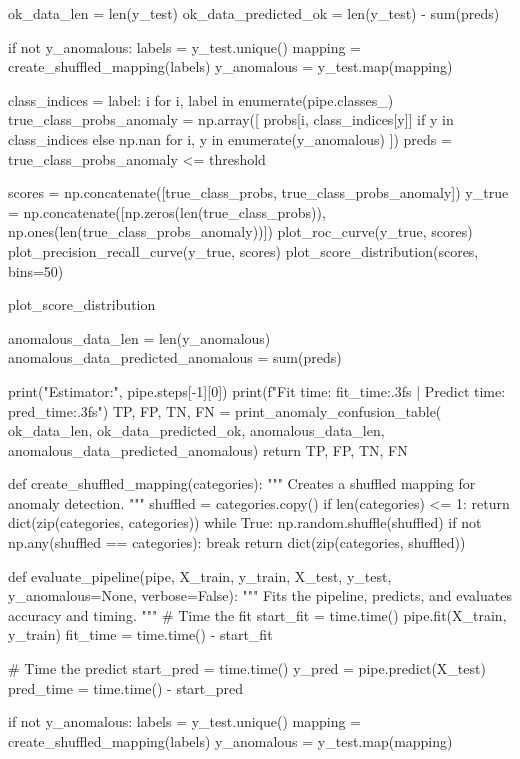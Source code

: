 {{    ok_data_len = len(y_test)
    ok_data_predicted_ok = len(y_test) - sum(preds)

    if not y_anomalous:
        labels = y_test.unique()
        mapping = create_shuffled_mapping(labels)
        y_anomalous = y_test.map(mapping)

    class_indices = {label: i for i, label in enumerate(pipe.classes_)}
    true_class_probs_anomaly = np.array([
        probs[i, class_indices[y]] if y in class_indices else np.nan
        for i, y in enumerate(y_anomalous)
    ])
    preds = true_class_probs_anomaly <= threshold

    scores = np.concatenate([true_class_probs, true_class_probs_anomaly])
    y_true = np.concatenate([np.zeros(len(true_class_probs)), np.ones(len(true_class_probs_anomaly))])
    plot_roc_curve(y_true, scores)
    plot_precision_recall_curve(y_true, scores)
    plot_score_distribution(scores, bins=50)
    
    
    plot_score_distribution

    anomalous_data_len = len(y_anomalous)
    anomalous_data_predicted_anomalous = sum(preds)

    print("Estimator:", pipe.steps[-1][0])
    print(f"Fit time: {fit_time:.3f}s | Predict time: {pred_time:.3f}s")
    TP, FP, TN, FN = print_anomaly_confusion_table(
        ok_data_len, ok_data_predicted_ok, anomalous_data_len, anomalous_data_predicted_anomalous)
    return TP, FP, TN, FN


def create_shuffled_mapping(categories):
    """
    Creates a shuffled mapping for anomaly detection.
    """
    shuffled = categories.copy()
    if len(categories) <= 1:
        return dict(zip(categories, categories))
    while True:
        np.random.shuffle(shuffled)
        if not np.any(shuffled == categories):
            break
    return dict(zip(categories, shuffled))


def evaluate_pipeline(pipe, X_train, y_train, X_test, y_test, y_anomalous=None, verbose=False):
    """
    Fits the pipeline, predicts, and evaluates accuracy and timing.
    """
    # Time the fit
    start_fit = time.time()
    pipe.fit(X_train, y_train)
    fit_time = time.time() - start_fit

    # Time the predict
    start_pred = time.time()
    y_pred = pipe.predict(X_test)
    pred_time = time.time() - start_pred

    if not y_anomalous:
        labels = y_test.unique()
        mapping = create_shuffled_mapping(labels)
        y_anomalous = y_test.map(mapping)

}}
